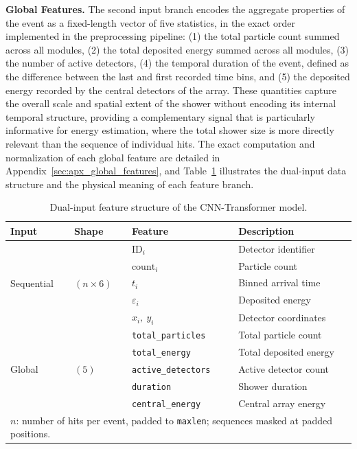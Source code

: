 \textbf{Global Features.} The second input branch encodes the aggregate properties of the event as a fixed-length vector of five statistics, in the exact order implemented in the preprocessing pipeline: (1) the total particle count summed across all modules, (2) the total deposited energy summed across all modules, (3) the number of active detectors, (4) the temporal duration of the event, defined as the difference between the last and first recorded time bins, and (5) the deposited energy recorded by the central detectors of the array. These quantities capture the overall scale and spatial extent of the shower without encoding its internal temporal structure, providing a complementary signal that is particularly informative for energy estimation, where the total shower size is more directly relevant than the sequence of individual hits. The exact computation and normalization of each global feature are detailed in Appendix~\ref{sec:apx_global_features}, and Table~\ref{tab:dual-input} illustrates the dual-input data structure and the physical meaning of each feature branch.
\begin{table}[ht!]
\centering
\small
\caption[Dual-input feature structure.]{Dual-input feature structure of the
CNN-Transformer model.}
\label{tab:dual-input}
\setlength{\tabcolsep}{8pt}
\renewcommand{\arraystretch}{1.15}
\begin{tabular}{llll}
\toprule
\textbf{Input} & \textbf{Shape} & \textbf{Feature} & \textbf{Description} \\
\midrule
\multirow{5}{*}{Sequential} & \multirow{5}{*}{$(n \times 6)$}
    & $\text{ID}_i$               & Detector identifier \\
 && $\text{count}_i$              & Particle count \\
 && $t_i$                         & Binned arrival time \\
 && $\varepsilon_i$               & Deposited energy \\
 && $x_i,\ y_i$                  & Detector coordinates \\
\midrule
\multirow{5}{*}{Global} & \multirow{5}{*}{$(5)$}
    & \texttt{total\_particles}   & Total particle count \\
 && \texttt{total\_energy}        & Total deposited energy \\
 && \texttt{active\_detectors}    & Active detector count \\
 && \texttt{duration}             & Shower duration \\
 && \texttt{central\_energy}      & Central array energy \\
\bottomrule
\multicolumn{4}{l}{%
    \footnotesize $n$: number of hits per event, padded to \texttt{maxlen};
    sequences masked at padded positions.}
\end{tabular}
\end{table}

